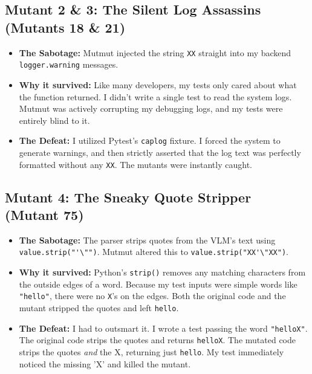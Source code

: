 \documentclass[a4paper,12pt]{article}
\begin{document}
\subsection{Mutant 2 \& 3: The Silent Log Assassins (Mutants 18 \& 21)}
\begin{itemize}
    \item \textbf{The Sabotage:} Mutmut injected the string \verb|XX| straight into my backend \verb|logger.warning| messages.
    \item \textbf{Why it survived:} Like many developers, my tests only cared about what the function returned. I didn't write a single test to read the system logs. Mutmut was actively corrupting my debugging logs, and my tests were entirely blind to it.
    \item \textbf{The Defeat:} I utilized Pytest's \verb|caplog| fixture. I forced the system to generate warnings, and then strictly asserted that the log text was perfectly formatted without any \verb|XX|. The mutants were instantly caught.
\end{itemize}

\subsection{Mutant 4: The Sneaky Quote Stripper (Mutant 75)}
\begin{itemize}
    \item \textbf{The Sabotage:} The parser strips quotes from the VLM's text using \verb|value.strip("'\"")|. Mutmut altered this to \verb|value.strip("XX'\"XX")|.
    \item \textbf{Why it survived:} Python's \verb|strip()| removes any matching characters from the outside edges of a word. Because my test inputs were simple words like \verb|"hello"|, there were no \verb|X|'s on the edges. Both the original code and the mutant stripped the quotes and left \verb|hello|.
    \item \textbf{The Defeat:} I had to outsmart it. I wrote a test passing the word \verb|"helloX"|. The original code strips the quotes and returns \verb|helloX|. The mutated code strips the quotes \textit{and} the X, returning just \verb|hello|. My test immediately noticed the missing 'X' and killed the mutant.
\end{itemize}
\end{document}
